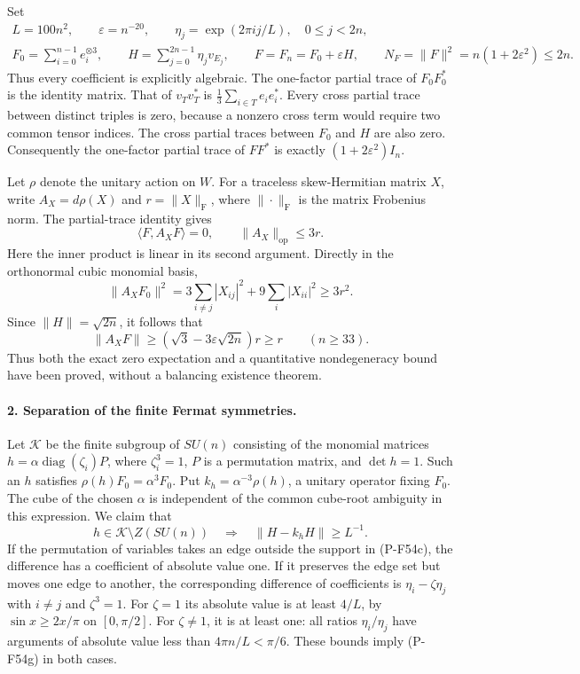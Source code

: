 \documentclass[11pt,a4paper]{article}
\begin{document}
Set
\[
 \begin{gathered}
 L=100n^2,\qquad \varepsilon=n^{-20},\qquad
 \eta_j=\exp(2\pi i j/L),\quad0\le j<2n,\\
 F_0=\sum_{i=0}^{n-1}e_i^{\otimes3},\qquad
 H=\sum_{j=0}^{2n-1}\eta_jv_{E_j},\qquad
 F=F_n=F_0+\varepsilon H,\qquad
 N_F=\|F\|^2=n(1+2\varepsilon^2)\le2n.
 \end{gathered}                                                   \tag{P-F54d}
\]
Thus every coefficient is explicitly algebraic. The one-factor
partial trace of $F_0F_0^*$ is the identity matrix. That of
$v_Tv_T^*$ is $\frac13\sum_{i\in T}e_ie_i^*$.
Every cross partial trace between distinct triples is zero,
because a nonzero cross term would require two common tensor
indices. The cross partial traces between $F_0$ and $H$ are
also zero. Consequently the one-factor partial trace of $FF^*$
is exactly $(1+2\varepsilon^2)I_n$.

Let $\rho$ denote the unitary action on $W$. For a traceless
skew-Hermitian matrix $X$, write $A_X=d\rho(X)$ and
$r=\|X\|_{\mathrm F}$, where $\|\cdot\|_{\mathrm F}$ is the
matrix Frobenius norm. The partial-trace identity gives
\[
       \langle F,A_XF\rangle=0,
       \qquad \|A_X\|_{\mathrm{op}}\le3r.                    \tag{P-F54e}
\]
Here the inner product is linear in its second argument.
Directly in the orthonormal cubic monomial basis,
\[
 \|A_XF_0\|^2
   =3\sum_{i\ne j}|X_{ij}|^2+9\sum_i|X_{ii}|^2
   \ge3r^2.
\]
Since $\|H\|=\sqrt{2n}$, it follows that
\[
 \|A_XF\|\ge(\sqrt3-3\varepsilon\sqrt{2n})r\ge r
                        \qquad(n\ge33).                      \tag{P-F54f}
\]
Thus both the exact zero expectation and a quantitative
nondegeneracy bound have been proved, without a balancing
existence theorem.

\paragraph{2. Separation of the finite Fermat symmetries.}
Let $\mathcal K$ be the finite subgroup of $SU(n)$ consisting of
the monomial matrices
$h=\alpha\operatorname{diag}(\zeta_i)P$, where
$\zeta_i^3=1$, $P$ is a permutation matrix, and $\det h=1$.
Such an $h$ satisfies $\rho(h)F_0=\alpha^3F_0$.
Put $k_h=\alpha^{-3}\rho(h)$, a unitary operator fixing $F_0$.
The cube of the chosen $\alpha$ is independent of the common
cube-root ambiguity in this expression.
We claim that
\[
       h\in\mathcal K\setminus Z(SU(n))
       \quad\Longrightarrow\quad
                  \|H-k_hH\|\ge L^{-1}.                     \tag{P-F54g}
\]
If the permutation of variables takes an edge outside the
support in (P-F54c), the difference has a coefficient of
absolute value one. If it preserves the edge set but moves
one edge to another, the corresponding difference of
coefficients is $\eta_i-\zeta\eta_j$ with $i\ne j$ and
$\zeta^3=1$. For $\zeta=1$ its absolute value is at least
$4/L$, by $\sin x\ge2x/\pi$ on $[0,\pi/2]$.
For $\zeta\ne1$, it is at least one: all ratios
$\eta_i/\eta_j$ have arguments of absolute value less than
$4\pi n/L<\pi/6$. These bounds imply (P-F54g) in both cases.
\end{document}
